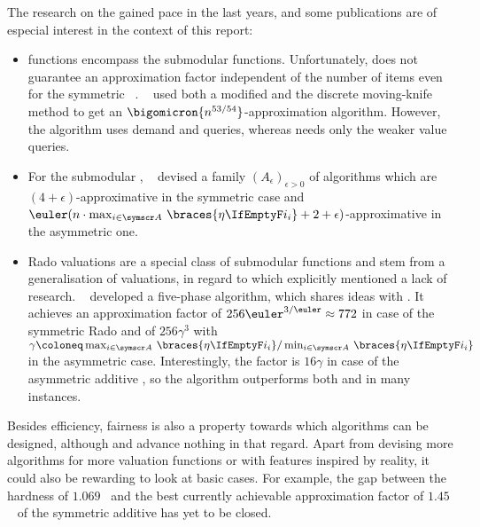 The research on the \NSW{} gained pace in the last years, and some publications are of especial interest in the context of this report:
\begin{itemize}
	\item
	\XOS{} functions encompass the submodular functions.
	Unfortunately, \RepReMatch{} does not guarantee an approximation factor independent of the number of items even for the symmetric \XOS{} \NSW~\cite[Section 6.2]{APNSWuSVþUM}.
	~\cite{sublin_approx_algo_for_nsw_with_xos_valuations} used both a modified \RepReMatch{} and the discrete moving-knife method to get an \(\bigomicron{n^{53/54}}\)-approximation algorithm.
	However, the algorithm uses demand and \XOS{} queries, whereas \RepReMatch{} needs only the weaker value queries.

	\item
	For the submodular \NSW, \citeauthor{approx_nsw_by_matching_and_local_search}~\cite{approx_nsw_by_matching_and_local_search} devised a family \((A_\epsilon)_{\epsilon > 0}\) of algorithms which are \((4+\epsilon)\)-approximative in the symmetric case and \(\euler(n \cdot \max_{i \in \agents} \,\braces{\weight} + 2 + \epsilon)\)-approximative in the asymmetric one.

	\item
	Rado valuations are a special class of submodular functions and stem from a generalisation of \OXS{} valuations, in regard to which \citeauthor{APNSWuSVþUM} explicitly mentioned a lack of research.
	~\cite{approximating_nsw_under_rado_valuations} developed a five-phase algorithm, which shares ideas with \RepReMatch.
	It achieves an approximation factor of \(256 \euler^{3/\euler} \approx 772\) in case of the symmetric Rado \NSW{} and of \(256 \gamma^3\) with \(\gamma \coloneq \max_{i \in \agents} \,\braces{\weight} / \min_{i \in \agents} \,\braces{\weight}\) in the asymmetric case.
	Interestingly, the factor is \(16 \gamma\) in case of the asymmetric additive \NSW, so the algorithm outperforms both \SMatch{} and \RepReMatch{} in many instances.
\end{itemize}
Besides efficiency, fairness is also a property towards which algorithms can be designed, although \SMatch{} and \RepReMatch{} advance nothing in that regard.
Apart from devising more algorithms for more valuation functions or with features inspired by reality, it could also be rewarding to look at basic cases.
For example, the gap between the hardness of \(1.069\)~\cite{satiation_in_fisher_markets_and_approx_of_nsw} and the best currently achievable approximation factor of \(1.45\)~\cite{finding_fair_and_efficient_allocs} of the symmetric additive \NSW{} has yet to be closed.